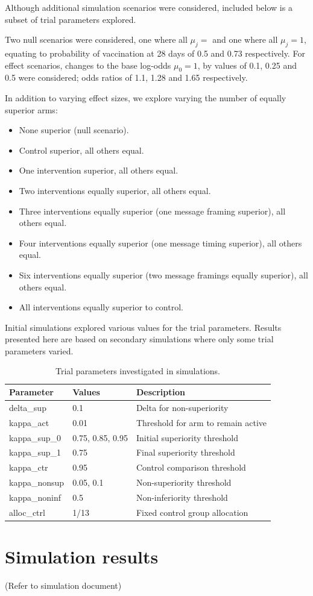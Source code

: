 \documentclass[
  bibliography=totoc]{scrreprt}
\providecommand{\tightlist}{%
  \setlength{\itemsep}{0pt}\setlength{\parskip}{0pt}}
\begin{document}
Although additional simulation scenarios were considered, included below is a subset of trial parameters explored.

Two null scenarios were considered, one where all \(\mu_j=\) and one where all \(\mu_j=1\), equating to probability of vaccination at 28 days of 0.5 and 0.73 respectively. For effect scenarios, changes to the base log-odds \(\mu_0=1\), by values of 0.1, 0.25 and 0.5 were considered; odds ratios of 1.1, 1.28 and 1.65 respectively.

In addition to varying effect sizes, we explore varying the number of equally superior arms:

\begin{itemize}
\tightlist
\item
  None superior (null scenario).
\item
  Control superior, all others equal.
\item
  One intervention superior, all others equal.
\item
  Two interventions equally superior, all others equal.
\item
  Three interventions equally superior (one message framing superior), all others equal.
\item
  Four interventions equally superior (one message timing superior), all others equal.
\item
  Six interventions equally superior (two message framings equally superior), all others equal.
\item
  All interventions equally superior to control.
\end{itemize}

Initial simulations explored various values for the trial parameters.
Results presented here are based on secondary simulations where only some trial parameters varied.

\begin{table}[!h]

\caption{\label{tab:simpars}Trial parameters investigated in simulations.}
\centering
\fontsize{8}{10}\selectfont
\begin{tabular}[t]{lll}
\toprule
Parameter & Values & Description\\
\midrule
delta\_sup & 0.1 & Delta for non-superiority\\
kappa\_act & 0.01 & Threshold for arm to remain active\\
kappa\_sup\_0 & 0.75, 0.85, 0.95 & Initial superiority threshold\\
kappa\_sup\_1 & 0.75 & Final superiority threshold\\
kappa\_ctr & 0.95 & Control comparison threshold\\
kappa\_nonsup & 0.05, 0.1 & Non-superiority threshold\\
kappa\_noninf & 0.5 & Non-inferiority threshold\\
alloc\_ctrl & 1/13 & Fixed control group allocation\\
\bottomrule
\end{tabular}
\end{table}

\hypertarget{simulation-results}{%
\section{Simulation results}\label{simulation-results}}

(Refer to simulation document)

\renewcommand\refname{References}

\end{document}
